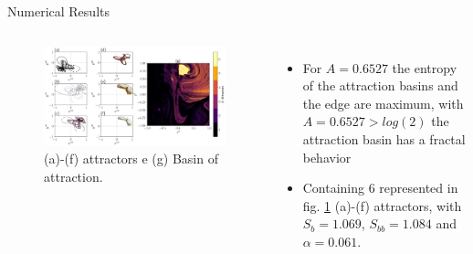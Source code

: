 \documentclass[
	10pt,aspectratio=169 %
]{beamer}
\begin{document}
\begin{frame}{Numerical Results}
   \transwipe
\begin{columns}
    \begin{figure}
        \centering
        \includegraphics[scale=0.27]{Imagens/basins.png}
        \caption{(a)-(f) attractors e (g) Basin of attraction.}
        \label{fig:fig02}
    \end{figure}
\begin{itemize}
\item For $A = 0.6527$ the entropy of the attraction basins and the edge are maximum, with $A = 0.6527 > log(2)$ the attraction basin has a fractal behavior
\item Containing $6$ represented in fig. \ref{fig:fig02} (a)-(f) attractors, with $S_{b} = 1.069 $, $S_{bb} = 1.084 $ and $ \alpha = 0.061$.
\end{itemize}
\end{columns}    
\end{frame}
\end{document}
